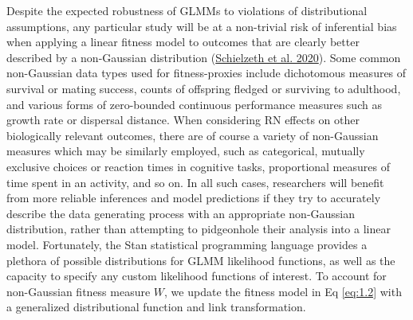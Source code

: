 \documentclass{article}
\begin{document}
Despite the expected robustness of GLMMs to violations of distributional
assumptions, any particular study will be at a non-trivial risk of
inferential bias when applying a linear fitness model to outcomes that
are clearly better described by a non-Gaussian distribution
(\protect\hyperlink{ref-Schiel2020}{Schielzeth et al. 2020}). Some
common non-Gaussian data types used for fitness-proxies include
dichotomous measures of survival or mating success, counts of offspring
fledged or surviving to adulthood, and various forms of zero-bounded
continuous performance measures such as growth rate or dispersal
distance. When considering RN effects on other biologically relevant
outcomes, there are of course a variety of non-Gaussian measures which
may be similarly employed, such as categorical, mutually exclusive
choices or reaction times in cognitive tasks, proportional measures of
time spent in an activity, and so on. In all such cases, researchers
will benefit from more reliable inferences and model predictions if they
try to accurately describe the data generating process with an
appropriate non-Gaussian distribution, rather than attempting to
pidgeonhole their analysis into a linear model. Fortunately, the Stan
statistical programming language provides a plethora of possible
distributions for GLMM likelihood functions, as well as the capacity to
specify any custom likelihood functions of interest. To account for
non-Gaussian fitness measure \(W\), we update the fitness model in Eq
\ref{eq:1.2} with a generalized distributional function and link
transformation.
\end{document}
